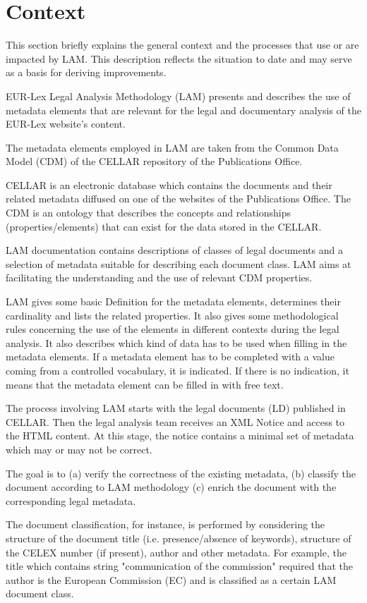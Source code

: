 \section{Context}\label{sec:context}

This section briefly explains the general context and the processes
that use or are impacted by LAM. This description reflects the situation to
date and may serve as a basis for deriving improvements.

EUR-Lex Legal Analysis Methodology (LAM) presents and describes the use
of metadata elements that are relevant for the legal and documentary
analysis of the EUR-Lex website's content.

The metadata elements employed in LAM are taken from the Common Data
Model (CDM) of the CELLAR repository of the Publications Office.

CELLAR is an electronic database which contains the documents and their
related metadata diffused on one of the websites of the Publications
Office. The CDM is an ontology that describes the concepts and
relationships (properties/elements) that can exist for the data stored
in the CELLAR.

LAM documentation contains descriptions of classes of legal documents
and a selection of metadata suitable for describing each document class.
LAM aims at facilitating the understanding and the use of relevant CDM
properties.

LAM gives some basic Definition for the metadata elements, determines
their cardinality and lists the related properties. It also gives some
methodological rules concerning the use of the elements in different
contexts during the legal analysis. It also describes which kind of data
has to be used when filling in the metadata elements. If a metadata
element has to be completed with a value coming from a controlled
vocabulary, it is indicated. If there is no indication, it means that
the metadata element can be filled in with free text.

The process involving LAM starts with the legal documents (LD) published
in CELLAR. Then the legal analysis team receives an XML Notice and
access to the HTML content. At this stage, the notice contains a minimal
set of metadata which may or may not be correct.

The goal is to (a) verify the correctness of the existing metadata, (b)
classify the document according to LAM methodology (c) enrich the
document with the corresponding legal metadata.

The document classification, for instance, is performed by considering
the structure of the document title (i.e. presence/absence of keywords),
structure of the CELEX number (if present), author and other metadata.
For example, the title which contains string "communication of the
commission" required that the author is the European Commission (EC) and
is classified as a certain LAM document class.

